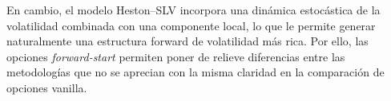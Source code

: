 En cambio, el modelo Heston--SLV incorpora una dinámica estocástica de la volatilidad combinada con una componente local, lo que le permite generar naturalmente una estructura forward de volatilidad más rica. Por ello, las opciones \textit{forward-start} permiten poner de relieve diferencias entre las metodologías que no se aprecian con la misma claridad en la comparación de opciones vanilla.

